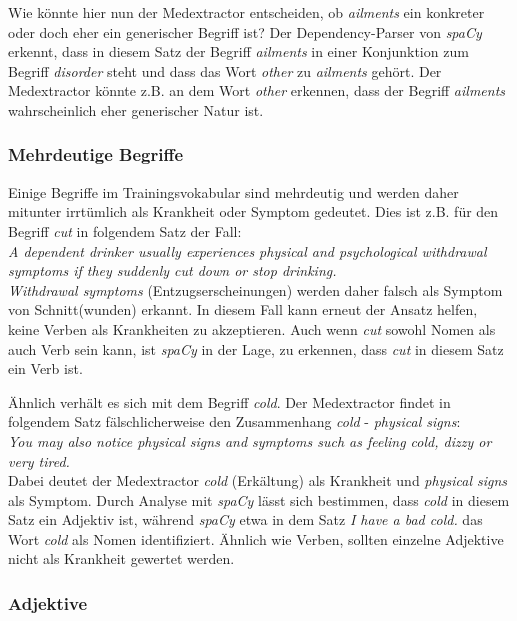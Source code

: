 Wie könnte hier nun der Medextractor entscheiden, ob \emph{ailments} ein konkreter oder doch eher ein generischer Begriff ist? Der Dependency-Parser von \emph{spaCy} erkennt, dass in diesem Satz der Begriff \emph{ailments} in einer Konjunktion zum Begriff \emph{disorder} steht und dass das Wort \emph{other} zu \emph{ailments} gehört. Der Medextractor könnte z.B. an dem Wort \emph{other} erkennen, dass der Begriff \emph{ailments} wahrscheinlich eher generischer Natur ist.

\subsubsection{Mehrdeutige Begriffe}
\label{subsec: mehrdeutig} 

Einige Begriffe im Trainingsvokabular sind mehrdeutig und werden daher mitunter irrtümlich als Krankheit oder Symptom gedeutet. Dies ist z.B. für den Begriff \emph{cut} in folgendem Satz der Fall:\\

\emph{\glqq A dependent drinker usually experiences physical and psychological withdrawal symptoms if they suddenly cut down or stop drinking.\grqq}\\

\emph{Withdrawal symptoms} (Entzugserscheinungen) werden daher falsch als Symptom von Schnitt(wunden) erkannt. In diesem Fall kann erneut der Ansatz helfen, keine Verben als Krankheiten zu akzeptieren. Auch wenn \emph{cut} sowohl Nomen als auch Verb sein kann, ist \emph{spaCy} in der Lage, zu erkennen, dass \emph{cut} in diesem Satz ein Verb ist.

Ähnlich verhält es sich mit dem Begriff \emph{cold}. Der Medextractor findet in folgendem Satz fälschlicherweise den Zusammenhang \emph{cold} - \emph {physical signs}:\\

\emph{\glqq You may also notice physical signs and symptoms such as feeling cold, dizzy or very tired.\grqq}\\

Dabei deutet der Medextractor \emph{cold} (Erkältung) als Krankheit und \emph{physical signs} als Symptom.  Durch Analyse mit \emph{spaCy} lässt sich bestimmen, dass \emph{cold} in diesem Satz ein Adjektiv ist, während \emph{spaCy} etwa in dem Satz \emph{\glqq I have a bad cold.\grqq} das Wort \emph{cold} als Nomen identifiziert. Ähnlich wie Verben, sollten einzelne Adjektive nicht als Krankheit gewertet werden.

\subsubsection{Adjektive}
\label{subsec: adjektiv} 


